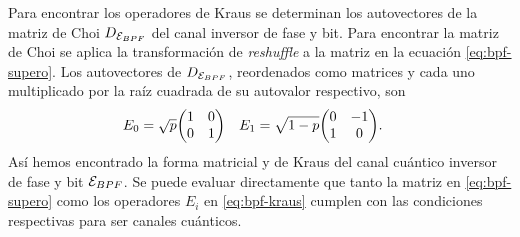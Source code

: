 Para encontrar los operadores de Kraus se determinan los autovectores
de la matriz de Choi $D_{\mathcal{E}_{BPF}}$ del canal inversor de fase y bit. 
Para encontrar la matriz de Choi se aplica la transformación 
de \textit{reshuffle} a la matriz en la ecuación \eqref{eq:bpf-supero}.
Los autovectores de $D_{\mathcal{E}_{BPF}}$, reordenados como matrices y
cada uno multiplicado por la raíz cuadrada de su autovalor respectivo, son
\begin{align}
E_0&=
\sqrt{p}
\mqty(
1 & 0\\
0 & 1
)&
E_1&=
\sqrt{1-p}
\mqty(
0 & -1\\
1 & 0
).
\label{eq:bpf-kraus}
\end{align}
Así hemos encontrado la forma matricial y de Kraus del canal
cuántico inversor de fase y bit $\mathcal{E}_{BPF}$. Se puede evaluar directamente que 
tanto la matriz en \eqref{eq:bpf-supero} como los operadores $E_i$
en \eqref{eq:bpf-kraus} cumplen con las condiciones respectivas
para ser canales cuánticos.

